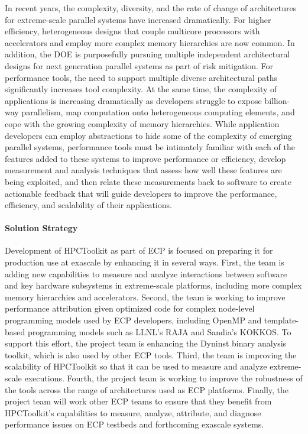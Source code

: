 In recent years, the complexity, diversity, and the rate of change of
architectures for extreme-scale parallel systems have increased
dramatically. For higher efficiency, heterogeneous designs that couple
multicore processors with accelerators and employ more complex memory
hierarchies are now common. In addition, the DOE is purposefully
pursuing multiple independent architectural designs for next
generation parallel systems as part of risk mitigation. For
performance tools, the need to support multiple diverse architectural
paths significantly increases tool complexity.  At the same time, the
complexity of applications is increasing dramatically as developers
struggle to expose billion-way parallelism, map computation onto
heterogeneous computing elements, and cope with the growing complexity
of memory hierarchies. While application developers can employ
abstractions to hide some of the complexity of emerging parallel
systems, performance tools must be intimately familiar with each of
the features added to these systems to improve performance or
efficiency, develop measurement and analysis techniques that assess
how well these features are being exploited, and then relate these
measurements back to software to create actionable feedback that will
guide developers to improve the performance, efficiency, and
scalability of their applications.

\paragraph{Solution Strategy}

Development of HPCToolkit as part of ECP is focused on preparing it
for production use at exascale by enhancing it in several ways. First,
the team is adding new capabilities to measure and analyze
interactions between software and key hardware subsystems in
extreme-scale platforms, including more complex memory hierarchies and
accelerators. Second, the team is working to improve performance
attribution given optimized code for complex node-level programming
models used by ECP developers, including OpenMP and template-based
programming models such as LLNL's RAJA and Sandia's KOKKOS. To support
this effort, the project team is enhancing the Dyninst binary analysis
toolkit, which is also used by other ECP tools. Third, the team is
improving the scalability of HPCToolkit so that it can be used to
measure and analyze extreme-scale executions. Fourth, the project team
is working to improve the robustness of the tools across the range of
architectures used as ECP platforms. Finally, the project team will
work other ECP teams to ensure that they benefit from HPCToolkit's
capabilities to measure, analyze, attribute, and diagnose performance
issues on ECP testbeds and forthcoming exascale systems.

